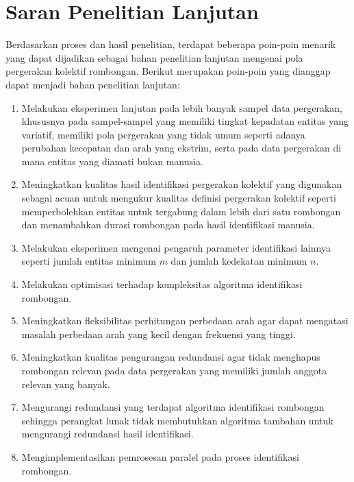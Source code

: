 \section{Saran Penelitian Lanjutan}
\label{sec:saran}

Berdasarkan proses dan hasil penelitian, terdapat beberapa poin-poin menarik yang dapat dijadikan sebagai bahan penelitian lanjutan mengenai pola pergerakan kolektif rombongan. Berikut merupakan poin-poin yang dianggap dapat menjadi bahan penelitian lanjutan:

\clearpage

\begin{enumerate}
    \item Melakukan eksperimen lanjutan pada lebih banyak sampel data pergerakan, khususnya pada sampel-sampel yang memiliki tingkat kepadatan entitas yang variatif, memiliki pola pergerakan yang tidak umum seperti adanya perubahan kecepatan dan arah yang ekstrim, serta pada data pergerakan di mana entitas yang diamati bukan manusia.
    \item Meningkatkan kualitas hasil identifikasi pergerakan kolektif yang digunakan sebagai acuan untuk mengukur kualitas definisi pergerakan kolektif seperti memperbolehkan entitas untuk tergabung dalam lebih dari satu rombongan dan menambahkan durasi rombongan pada hasil identifikasi manusia.
    \item Melakukan eksperimen mengenai pengaruh parameter identifikasi lainnya seperti jumlah entitas minimum $m$ dan jumlah kedekatan minimum $n$.
    \item Melakukan optimisasi terhadap kompleksitas algoritma identifikasi rombongan.
    \item Meningkatkan fleksibilitas perhitungan perbedaan arah agar dapat mengatasi masalah perbedaan arah yang kecil dengan frekuensi yang tinggi.
    \item Meningkatkan kualitas pengurangan redundansi agar tidak menghapus rombongan relevan pada data pergerakan yang memiliki jumlah anggota relevan yang banyak.
    \item Mengurangi redundansi yang terdapat algoritma identifikasi rombongan sehingga perangkat lunak tidak membutuhkan algoritma tambahan untuk mengurangi redundansi hasil identifikasi.
    \item Mengimplementasikan pemrosesan paralel pada proses identifikasi rombongan.
\end{enumerate}